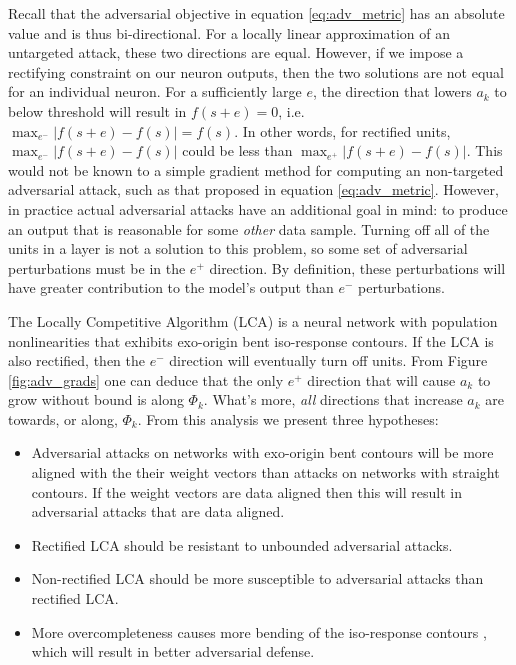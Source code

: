 Recall that the adversarial objective in equation \ref{eq:adv_metric} has an absolute value and is thus bi-directional. For a locally linear approximation of an untargeted attack, these two directions are equal. However, if we impose a rectifying constraint on our neuron outputs, then the two solutions are not equal for an individual neuron. For a sufficiently large $e$, the direction that lowers $a_{k}$ to below threshold will result in $f(s+e)=0$, i.e. $\max_{e^{-}}|f(s+e)-f(s)| = f(s)$. In other words, for rectified units, $\max_{e^{-}}|f(s+e)-f(s)|$ could be less than $\max_{e^{+}}|f(s+e)-f(s)|$. This would not be known to a simple gradient method for computing an non-targeted adversarial attack, such as that proposed in equation \ref{eq:adv_metric}. However, in practice actual adversarial attacks have an additional goal in mind: to produce an output that is reasonable for some \emph{other} data sample. Turning off all of the units in a layer is not a solution to this problem, so some set of adversarial perturbations must be in the $e^{+}$ direction. By definition, these perturbations will have greater contribution to the model's output than $e^{-}$ perturbations.

The Locally Competitive Algorithm (LCA) is a neural network with population nonlinearities that exhibits exo-origin bent iso-response contours. If the LCA is also rectified, then the $e^{-}$ direction will eventually turn off units. From Figure \ref{fig:adv_grads} one can deduce that the only $e^{+}$ direction that will cause $a_{k}$ to grow without bound is along $\Phi_{k}$. What's more, \emph{all} directions that increase $a_{k}$ are towards, or along, $\Phi_{k}$. From this analysis we present three hypotheses:

\begin{itemize}
  \item Adversarial attacks on networks with exo-origin bent contours will be more aligned with the their weight vectors than attacks on networks with straight contours. If the weight vectors are data aligned then this will result in adversarial attacks that are data aligned.
  \item Rectified LCA should be resistant to unbounded adversarial attacks.
  \item Non-rectified LCA should be more susceptible to adversarial attacks than rectified LCA.
  \item More overcompleteness causes more bending of the iso-response contours \parencite{golden2016conjectures}, which will result in better adversarial defense.
\end{itemize}

